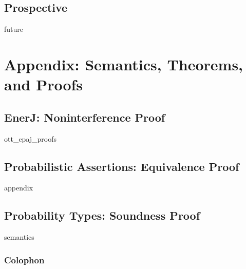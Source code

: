 \documentclass[ twoside,openright,titlepage,numbers=noenddot,headinclude,
                footinclude=true,cleardoublepage=empty,abstractoff,%
                BCOR=5mm,paper=letter,fontsize=11pt,letterpaper,%
                american,%
                ]{scrreprt}
\newcounter{dummy}
\begin{document}
\chapter{Prospective}
\label{ch:future}
{future}


\manualmark
\markboth{\spacedlowsmallcaps{\bibname}}{\spacedlowsmallcaps{\bibname}} %
{}

\label{app:bibliography}



\appendix
\part{Appendix: Semantics, Theorems, and Proofs}

\chapter{EnerJ: Noninterference Proof}
\label{app:enerj}
{ott_epaj_proofs}

\chapter{Probabilistic Assertions: Equivalence Proof}
\label{app:passert}
{appendix}

\chapter{Probability Types: Soundness Proof}
\label{app:decaf}
{semantics}


\cleardoublepage
\pagestyle{empty}
\vspace*{20ex}
\section*{Colophon}

\end{document}
